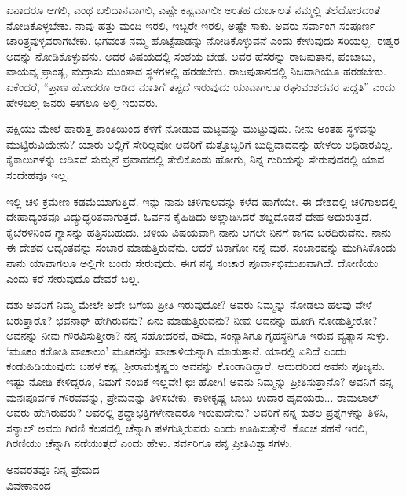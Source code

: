 ಏನಾದರೂ ಆಗಲಿ, ಎಂಥ ಬಲಿದಾನವಾಗಲಿ, ಎಷ್ಟೇ ಕಷ್ಟವಾಗಲೀ ಅಂತಹ ದುರ್ಬಲತೆ ನಮ್ಮಲ್ಲಿ ತಲೆದೋರದಂತೆ ನೋಡಿಕೊಳ್ಳಬೇಕು. ನಾವು ಹತ್ತು ಮಂದಿ ಇರಲಿ, ಇಬ್ಬರೇ ಇರಲಿ, ಅಷ್ಟೇ ಸಾಕು. ಅವರು ಸರ್ವಾಂಗ ಸಂಪೂರ್ಣ ಚಾರಿತ್ರ್ಯವುಳ್ಳವರಾಗಬೇಕು. ಭಗವಂತ ನಮ್ಮ ಹೊಟ್ಟೆಪಾಡನ್ನು ನೋಡಿಕೊಳ್ಳುವನೆ ಎಂದು ಕೇಳುವುದು ಸರಿಯಲ್ಲ. ಈಶ್ವರ ಅದನ್ನು ನೋಡಿಕೊಳ್ಳುವನು. ಅದರ ವಿಷಯದಲ್ಲಿ ಸಂಶಯ ಬೇಡ. ಅವರ ಹೆಸರನ್ನು ರಾಜಪುತಾನ, ಪಂಜಾಬು, ವಾಯವ್ಯ ಪ್ರಾಂತ್ಯ, ಮದ್ರಾಸು ಮುಂತಾದ ಸ್ಥಳಗಳಲ್ಲಿ ಹರಡಬೇಕು. ರಾಜಪುತಾನದಲ್ಲಿ ನಿಜವಾಗಿಯೂ ಹರಡಬೇಕು. ಏಕೆಂದರೆ, ``ಪ್ರಾಣ ಹೋದರೂ ಆಡಿದ ಮಾತಿಗೆ ತಪ್ಪದೆ ಇರುವುದು ಯಾವಾಗಲೂ ರಘುವಂಶದವರ ಪದ್ದತಿ” ಎಂದು ಹೇಳಬಲ್ಲ ಜನರು ಈಗಲೂ ಅಲ್ಲಿ ಇರುವರು.

ಪಕ್ಷಿಯು ಮೇಲೆ ಹಾರುತ್ತ ಶಾಂತಿಯಿಂದ ಕೆಳಗೆ ನೋಡುವ ಮಟ್ಟವನ್ನು ಮುಟ್ಟುವುದು. ನೀನು ಅಂತಹ ಸ್ಥಳವನ್ನು ಮುಟ್ಟಿರುವಿಯೇನು? ಯಾರು ಅಲ್ಲಿಗೆ ಸೇರಿಲ್ಲವೋ ಅವರಿಗೆ ಮತ್ತೊಬ್ಬರಿಗೆ ಬುದ್ದಿವಾದವನ್ನು ಹೇಳಲು ಅಧಿಕಾರವಿಲ್ಲ. ಕೈಕಾಲುಗಳನ್ನು ಆಡಿಸದೆ ಸುಮ್ಮನೆ ಪ್ರವಾಹದಲ್ಲಿ ತೇಲಿಕೊಂಡು ಹೋಗು, ನಿನ್ನ ಗುರಿಯನ್ನು ಸೇರುವುದರಲ್ಲಿ ಯಾವ ಸಂದೇಹವೂ ಇಲ್ಲ.

ಇಲ್ಲಿ ಚಳಿ ಕ್ರಮೇಣ ಕಡಮೆಯಾಗುತ್ತಿದೆ. ಇನ್ನು ನಾನು ಚಳಿಗಾಲವನ್ನು ಕಳೆದ ಹಾಗೆಯೇ. ಈ ದೇಶದಲ್ಲಿ ಚಳಿಗಾಲದಲ್ಲಿ ದೇಹಾದ್ಯಂತವೂ ವಿದ್ಯುದ್ಭರಿತವಾಗುತ್ತದೆ. ಓರ್ವನ ಕೈಹಿಡಿದು ಅಲ್ಲಾಡಿಸಿದರೆ ಶಬ್ದದೊಡನೆ ದೇಹ ಅದುರುತ್ತದೆ. ಕೈಬೆರಳಿನಿಂದ ಗ್ಯಾಸನ್ನು ಹತ್ತಿಸಬಹುದು. ಚಳಿಯ ವಿಷಯವಾಗಿ ನಾನು ಆಗಲೇ ನಿನಗೆ ಕಾಗದ ಬರೆದಿರುವೆನು. ನಾನು ಈ ದೇಶದ ಆದ್ಯಂತವನ್ನು ಸಂಚಾರ ಮಾಡುತ್ತಿರುವೆನು. ಆದರೆ ಚಿಕಾಗೋ ನನ್ನ ಮಠ. ಸಂಚಾರವನ್ನು ಮುಗಿಸಿಕೊಂಡು ನಾನು ಯಾವಾಗಲೂ ಅಲ್ಲಿಗೇ ಬಂದು ಸೇರುವುದು. ಈಗ ನನ್ನ ಸಂಚಾರ ಪೂರ್ವಾಭಿಮುಖವಾಗಿದೆ. ದೋಣಿಯು ಎಂದು ಕರೆ ಸೇರುವುದೊ ದೇವರೆ ಬಲ್ಲ.

ದಶು ಅವರಿಗೆ ನಿಮ್ಮ ಮೇಲೇ ಅದೇ ಬಗೆಯ ಪ್ರೀತಿ ಇರುವುದೋ? ಅವರು ನಿಮ್ಮನ್ನು ನೋಡಲು ಹಲವು ವೇಳೆ ಬರುತ್ತಾರೊ? ಭವನಾಥ್ ಹೇಗಿರುವನು? ಏನು ಮಾಡುತ್ತಿರುವನು? ನೀವು ಅವನನ್ನು ಹೋಗಿ ನೋಡುತ್ತೀರೋ? ಅವನನ್ನು ನೀವು ಗೌರವಿಸುತ್ತೀರಾ? ನನ್ನ ಸಹೋದರನೆ, ಹೌದು, ಸಂನ್ಯಾಸಿಗೂ ಗೃಹಸ್ಥನಿಗೂ ಇರುವ ವ್ಯತ್ಯಾಸ ಸುಳ್ಳು. `ಮೂಕಂ ಕರೋತಿ ವಾಚಾಲಂ' ಮೂಕನನ್ನು ವಾಚಾಳಿಯನ್ನಾಗಿ ಮಾಡುತ್ತಾನೆ. ಯಾರಲ್ಲಿ ಏನಿದೆ ಎಂದು ಕಂಡುಹಿಡಿಯುವುದು ಬಹಳ ಕಷ್ಟ. ಶ‍್ರೀರಾಮಕೃಷ್ಣರು ಅವನನ್ನು ಕೊಂಡಾಡಿದ್ದಾರೆ. ಆದುದರಿಂದ ಅವನು ಪೂಜ್ಯನು. ಇಷ್ಟು ನೋಡಿ ಕೇಳಿದ್ದರೂ, ನಿಮಗೆ ನಂಬಿಕೆ ಇಲ್ಲವೇ! ಛಿಃ ಹೋಗಿ! ಅವನು ನಿಮ್ಮನ್ನು ಪ್ರೀತಿಸುತ್ತಾನೊ? ಅವನಿಗೆ ನನ್ನ ಮನಃಪೂರ್ವಕ ಗೌರವವನ್ನು, ಪ್ರೇಮವನ್ನು ತಿಳಿಸಬೇಕು. ಕಾಳೀಕೃಷ್ಣ ಬಾಬು ಉದಾರ ಹೃದಯರು... ರಾಮಲಾಲ್ ಅವರು ಹೇಗಿರುವರು? ಅವರಲ್ಲಿ ಶ್ರದ್ಧಾಭಕ್ತಿಗಳೇನಾದರೂ ಇರುವುದೇನು? ಅವರಿಗೆ ನನ್ನ ಕುಶಲ ಪ್ರಶ್ನೆಗಳನ್ನು ತಿಳಿಸಿ, ಸನ್ಯಾಲ್ ಅವರು ಗಿರಣಿ ಕೆಲಸದಲ್ಲಿ ಚೆನ್ನಾಗಿ ಪಳಗುತ್ತಿರುವರು ಎಂದು ಊಹಿಸುತ್ತೇನೆ. ಕೊಂಚ ಸಹನೆ ಇರಲಿ, ಗಿರಣಿಯು ಚೆನ್ನಾಗಿ ನಡೆಯುತ್ತದೆ ಎಂದು ಹೇಳು. ಸರ್ವರಿಗೂ ನನ್ನ ಪ್ರೀತಿವಿಶ್ವಾಸಗಳು.

\vspace{-0.5cm}

{\flushright
ಅನವರತವೂ ನಿನ್ನ ಪ್ರೇಮದ\\ವಿವೇಕಾನಂದ\par}

\vspace{-0.5cm}

